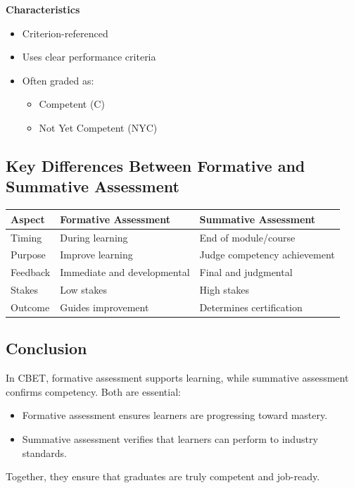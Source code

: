 \documentclass[12pt,a4paper]{article}
\begin{document}
\textbf{Characteristics}
\begin{itemize}
    \item Criterion-referenced
    \item Uses clear performance criteria
    \item Often graded as:
    \begin{itemize}
        \item Competent (C)
        \item Not Yet Competent (NYC)
    \end{itemize}
\end{itemize}

\subsection*{Key Differences Between Formative and Summative Assessment}

\begin{center}
\begin{tabular}{|l|l|l|}
\hline
\textbf{Aspect} & \textbf{Formative Assessment} & \textbf{Summative Assessment} \\
\hline
Timing & During learning & End of module/course \\
\hline
Purpose & Improve learning & Judge competency achievement \\
\hline
Feedback & Immediate and developmental & Final and judgmental \\
\hline
Stakes & Low stakes & High stakes \\
\hline
Outcome & Guides improvement & Determines certification \\
\hline
\end{tabular}
\end{center}

\subsection*{Conclusion}
In CBET, formative assessment supports learning, while summative assessment confirms competency. Both are essential:
\begin{itemize}
    \item Formative assessment ensures learners are progressing toward mastery.
    \item Summative assessment verifies that learners can perform to industry standards.
\end{itemize}

Together, they ensure that graduates are truly competent and job-ready.
\end{document}
